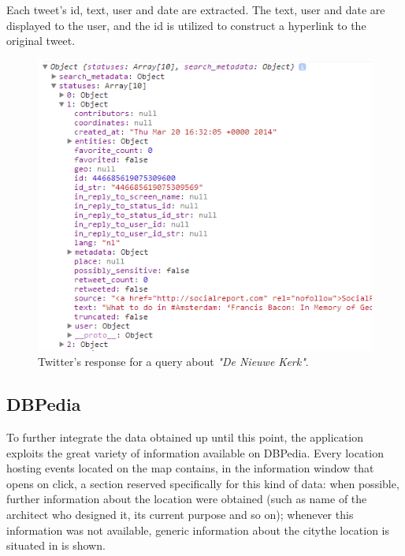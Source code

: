 \documentclass[hidelinks,a4paper]{article}
\begin{document}
Each tweet's id, text, user and date are extracted. The text, user and date are displayed to the user, and the id is utilized to construct a hyperlink to the original tweet.

\begin{figure}[h!]
  \centering
    \includegraphics[]{images/twitter_response.png}    
    \caption{Twitter's response for a query about \emph{"De Nieuwe Kerk"}.}
    \label{fig:twitter_response}
\end{figure}

\subsection{DBPedia}
To further integrate the data obtained up until this point, the application exploits the great variety of information available on DBPedia.
Every location hosting events located on the map contains, in the information window that opens on click, a section reserved specifically for this kind of data: when possible, further information about the location were obtained (such as name of the architect who designed it, its current purpose and so on); whenever this information was not available, generic information about the citythe location is situated in is shown.
\end{document}
